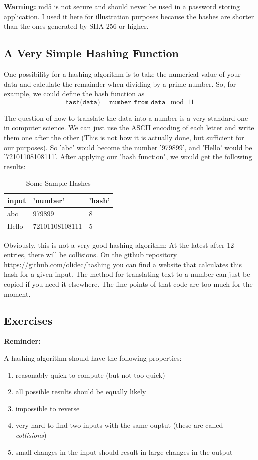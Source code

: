 \documentclass[11pt,a4paper]{report}
\begin{document}
\textbf{Warning:} md5 is not secure and should never be used in a password storing application.
I used it here for illustration purposes because the hashes are shorter than the ones generated by SHA-256 or higher.

\subsection{A Very Simple Hashing Function}

One possibility for a hashing algorithm is to take the numerical value of your data and calculate the remainder when dividing by a prime number.
So, for example, we could define the hash function as
\[
\texttt{hash(data)} = \texttt{number\_from\_data} \mod 11
\]

The question of how to translate the data into a number is a very standard one in computer science.
We can just use the ASCII encoding of each letter and write them one after the other (This is not how it is actually done, but sufficient for our purposes).
So 'abc' would become the number '979899', and 'Hello' would be '72101108108111'.
After applying our "hash function", we would get the following results:

\begin{table}[h]
\centering
\begin{tabular}{|l|l|l|}
\hline
input & 'number' & 'hash' \\
\hline
abc & 979899 & 8 \\
Hello & 72101108108111 & 5 \\
\hline
\end{tabular}
\caption{Some Sample Hashes}
\end{table}


Obviously, this is not a very good hashing algorithm: At the latest after 12 entries, there will be collisions.
On the github repository \url{https://github.com/olidec/hashing} you can find a website that calculates this hash for a given input.
The method for translating text to a number can just be copied if you need it elsewhere.
The fine points of that code are too much for the moment.
\subsection{Exercises}
{\bf Reminder: }

A hashing algorithm should have the following properties:
\begin{enumerate}
\item  reasonably quick to compute (but not too quick)
\item  all possible results should be equally likely
\item  impossible to reverse
\item  very hard to find two inputs with the same ouptut (these are called \emph{collisions})
\item  small changes in the input should result in large changes in the output
\end{enumerate}
\end{document}
